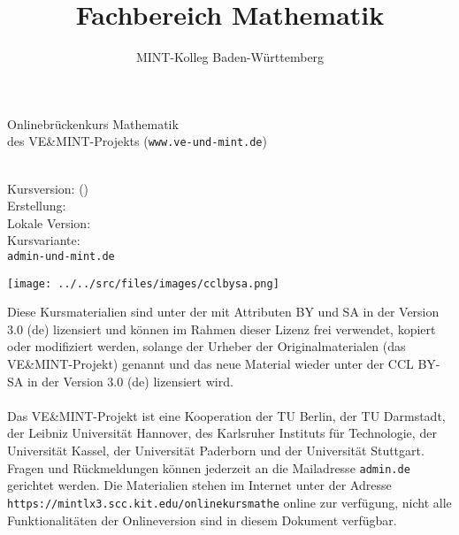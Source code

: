 

\title{Fachbereich Mathematik}
\author{MINT-Kolleg Baden-W\"urttemberg}



\MSetSubject{\MINTMathematics}

\begin{framed}
\begin{center}
\LARGE
Onlinebrückenkurs Mathematik\\
\large
des VE\&MINT-Projekts (\texttt{www.ve-und-mint.de})
\end{center}
\ \\
Kursversion: \MSignatureMain (\MSignatureVersion) \\
Erstellung: \MSignatureDate \\
Lokale Version: \MSignatureLocalization \\ 
Kursvariante: \MSignatureVariant \\
\scriptsize \texttt{admin\@@ve-und-mint.de}
\end{framed}

\begin{center}
\texttt{[image: ../../src/files/images/cclbysa.png]}
\end{center}
Diese Kursmaterialien sind unter der 
mit Attributen BY und SA in der Version 3.0 (de) lizensiert und können im Rahmen dieser
Lizenz frei verwendet, kopiert oder modifiziert werden, solange der Urheber der Originalmaterialen (das VE\&MINT-Projekt) genannt
und das neue Material wieder unter der CCL BY-SA in der Version 3.0 (de) lizensiert wird.
\ \\ \ \\
Das VE\&MINT-Projekt ist eine Kooperation der TU Berlin, der TU Darmstadt, der Leibniz Universität Hannover, des Karlsruher
Instituts für Technologie, der Universität Kassel, der Universität Paderborn und der Universität Stuttgart.
Fragen und Rückmeldungen können jederzeit an die Mailadresse \texttt{admin\@@veundmint.de} gerichtet werden.
Die Materialien stehen im Internet unter der Adresse \texttt{https://mintlx3.scc.kit.edu/onlinekursmathe}
online zur verfügung, nicht alle Funktionalitäten der Onlineversion sind in diesem Dokument verfügbar.




\tableofcontents



\MPrintIndex



